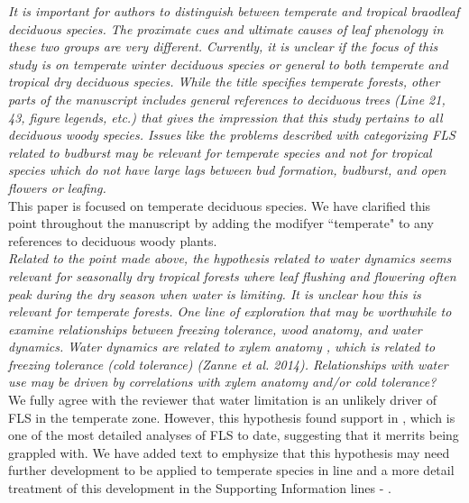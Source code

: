 \documentclass{article}[11pt]
\begin{document}
\emph{It is important for authors to distinguish between temperate and tropical braodleaf deciduous species. The proximate cues and ultimate causes of leaf phenology in these two groups are very different. Currently, it is unclear if the focus of this study is on temperate winter deciduous species or general to both temperate and tropical dry deciduous species. While the title specifies temperate forests, other parts of the manuscript includes general references to deciduous trees (Line 21, 43, figure legends, etc.) that gives the impression that this study pertains to all deciduous woody species.  Issues like the problems described with categorizing FLS related to budburst may be relevant for temperate species and not for tropical species which do not have large lags between bud formation, budburst, and open flowers or leafing.}\\

\noindent This paper is focused on temperate deciduous species. We have clarified this point throughout the manuscript by adding the modifyer ``temperate" to any references to deciduous woody plants.\\

\emph{Related to the point made above, the hypothesis related to water dynamics seems relevant for seasonally dry tropical forests where leaf flushing and flowering often peak during the dry season when water is limiting. It is unclear how this is relevant for temperate forests. One line of exploration that may be worthwhile to examine relationships between freezing tolerance, wood anatomy, and water dynamics. Water dynamics are related to xylem anatomy , which is related to freezing tolerance (cold tolerance) (Zanne et al. 2014). Relationships with water use may be driven by correlations with xylem anatomy and/or cold tolerance?}\\

\noindent We fully agree with the reviewer that water limitation is an unlikely driver of FLS in the temperate zone. However, this hypothesis found support in \citet{Gougherty2018}, which is one of the most detailed analyses of FLS to date, suggesting that it merrits being grappled with. We have added text to emphysize that this hypothesis may need further development to be applied to temperate species in line  and a more detail treatment of this development in the Supporting Information lines  - .\\
\end{document}
